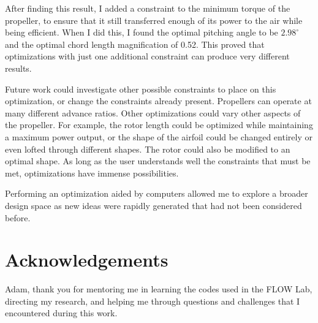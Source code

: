 \documentclass[journal ]{new-aiaa}
\begin{document}
After finding this result, I added a constraint to the minimum torque of the propeller, to ensure that it still transferred enough of its power to the air while being efficient. When I did this, I found the optimal pitching angle to be $2.98^{\circ}$ and the optimal chord length magnification of 0.52. This proved that optimizations with just one additional constraint can produce very different results.

Future work could investigate other possible constraints to place on this optimization, or change the constraints already present. Propellers can operate at many different advance ratios. Other optimizations could vary other aspects of the propeller. For example, the rotor length could be optimized while maintaining a maximum power output, or the shape of the airfoil could be changed entirely or even lofted through different shapes. The rotor could also be modified to an optimal shape. As long as the user understands well the constraints that must be met, optimizations have immense possibilities.

Performing an optimization aided by computers allowed me to explore a broader design space as new ideas were rapidly generated that had not been considered before.


\section{Acknowledgements}

Adam, thank you for mentoring me in learning the codes used in the FLOW Lab, directing my research, and helping me through questions and challenges that I encountered during this work.




\end{document}
